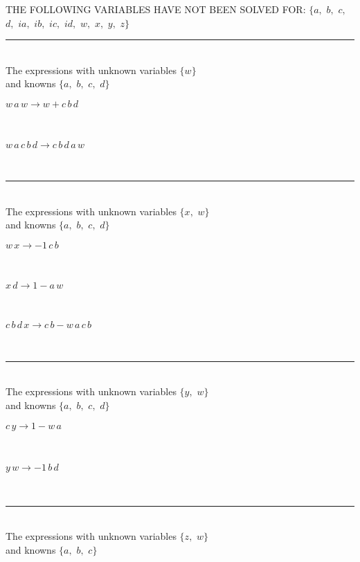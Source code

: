THE FOLLOWING VARIABLES HAVE NOT BEEN SOLVED FOR:\hfil\break
$\{a,
$ $
b,
$ $
c,
$ $
d,
$ $
ia,
$ $
ib,
$ $
ic,
$ $
id,
$ $
w,
$ $
x,
$ $
y,
$ $
z\}$
\smallskip\\
\rule[3pt]{6in}{.7pt}\\
The expressions with unknown variables $\{w\}$\\
and knowns $\{a,
$ $
b,
$ $
c,
$ $
d\}$\smallskip\\
\begin{minipage}{6in}
$
w\,
 a\,
 w\rightarrow w + c\,
 b\,
 d
$
\end{minipage}\medskip \\
\begin{minipage}{6in}
$
w\,
 a\,
 c\,
 b\,
 d\rightarrow c\,
 b\,
 d\,
 a\,
 w
$
\end{minipage}\\
\rule[3pt]{6in}{.7pt}\\
The expressions with unknown variables $\{x,
$ $
w\}$\\
and knowns $\{a,
$ $
b,
$ $
c,
$ $
d\}$\smallskip\\
\begin{minipage}{6in}
$
w\,
 x\rightarrow -1\,
 c\,
 b
$
\end{minipage}\medskip \\
\begin{minipage}{6in}
$
x\,
 d\rightarrow 1 - a\,
 w
$
\end{minipage}\medskip \\
\begin{minipage}{6in}
$
c\,
 b\,
 d\,
 x\rightarrow c\,
 b - w\,
 a\,
 c\,
 b
$
\end{minipage}\\
\rule[3pt]{6in}{.7pt}\\
The expressions with unknown variables $\{y,
$ $
w\}$\\
and knowns $\{a,
$ $
b,
$ $
c,
$ $
d\}$\smallskip\\
\begin{minipage}{6in}
$
c\,
 y\rightarrow 1 - w\,
 a
$
\end{minipage}\medskip \\
\begin{minipage}{6in}
$
y\,
 w\rightarrow -1\,
 b\,
 d
$
\end{minipage}\\
\rule[3pt]{6in}{.7pt}\\
The expressions with unknown variables $\{z,
$ $
w\}$\\
and knowns $\{a,
$ $
b,
$ $
c\}$\smallskip\\
